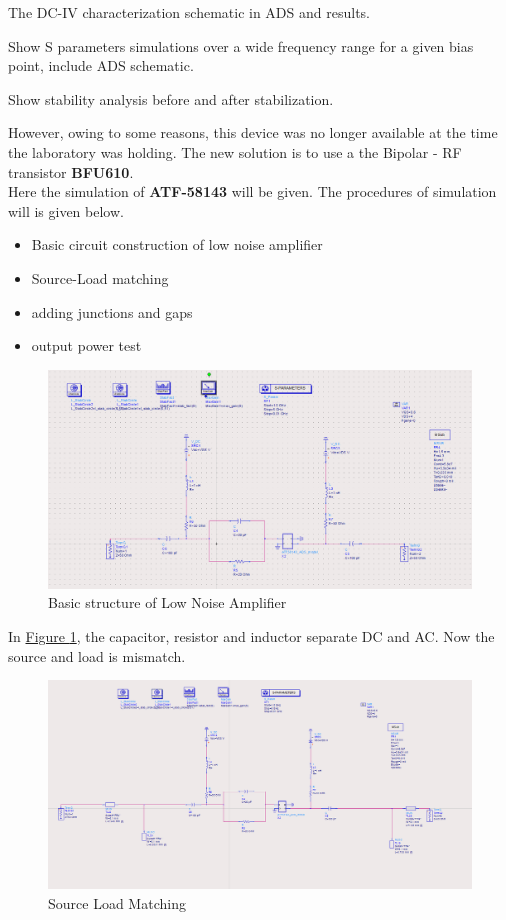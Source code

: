 \documentclass[12pt,a4paper]{report}
\begin{document}
The  DC-IV characterization schematic in ADS and results.

Show S parameters simulations over a wide frequency range for a given bias point, include
ADS schematic.

Show stability analysis before and after stabilization.

However, owing to some reasons, this device was no longer available at the time the laboratory was holding.
The new solution is to use a the Bipolar - RF transistor \textbf{BFU610}.\\
Here the simulation of \textbf{ATF-58143} will be given. The procedures of simulation will is given below.
\begin{itemize}
    \item Basic circuit construction of low noise amplifier
    \item Source-Load matching
    \item adding junctions and gaps
    \item output power test
\end{itemize}
\begin{figure}
    \centerline{\includegraphics[scale=0.5]{LNABasicCicuit.PNG}}
    \caption{Basic structure of Low Noise Amplifier}
    \label{LNA}
\end{figure}
In \hyperref[LNA]{Figure \ref*{LNA}}, the capacitor, resistor and inductor separate DC and AC. Now the source and load is mismatch.
\begin{figure}
    \centerline{\includegraphics[scale=0.5]{FirstMatching.PNG}}
    \caption{Source Load Matching}
    \label{fm}
\end{figure}
\end{document}
